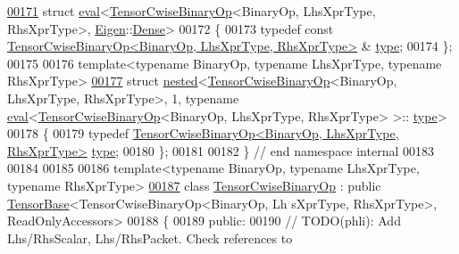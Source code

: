 \begin{DoxyCode}
\hyperlink{struct_eigen_1_1internal_1_1eval_3_01_tensor_cwise_binary_op_3_01_binary_op_00_01_lhs_xpr_type_07911fe375dfab05cfcedb209a79e59fe}{00171} \textcolor{keyword}{struct }\hyperlink{struct_eigen_1_1internal_1_1eval}{eval}<\hyperlink{class_eigen_1_1_tensor_cwise_binary_op}{TensorCwiseBinaryOp}<BinaryOp, LhsXprType, RhsXprType>, 
      \hyperlink{namespace_eigen}{Eigen}::\hyperlink{struct_eigen_1_1_dense}{Dense}>
00172 \{
00173   \textcolor{keyword}{typedef} \textcolor{keyword}{const} \hyperlink{class_eigen_1_1_tensor_cwise_binary_op}{TensorCwiseBinaryOp<BinaryOp, LhsXprType, RhsXprType>}
      & \hyperlink{class_eigen_1_1_tensor_cwise_binary_op}{type};
00174 \};
00175 
00176 \textcolor{keyword}{template}<\textcolor{keyword}{typename} BinaryOp, \textcolor{keyword}{typename} LhsXprType, \textcolor{keyword}{typename} RhsXprType>
\hyperlink{struct_eigen_1_1internal_1_1nested_3_01_tensor_cwise_binary_op_3_01_binary_op_00_01_lhs_xpr_typec43a72cea85b54495a72d72517229ff1}{00177} \textcolor{keyword}{struct }\hyperlink{struct_eigen_1_1internal_1_1nested}{nested}<\hyperlink{class_eigen_1_1_tensor_cwise_binary_op}{TensorCwiseBinaryOp}<BinaryOp, LhsXprType, RhsXprType>, 1, typename 
      \hyperlink{struct_eigen_1_1internal_1_1eval}{eval}<\hyperlink{class_eigen_1_1_tensor_cwise_binary_op}{TensorCwiseBinaryOp}<BinaryOp, LhsXprType, RhsXprType> >::
      \hyperlink{class_eigen_1_1_tensor_cwise_binary_op}{type}>
00178 \{
00179   \textcolor{keyword}{typedef} \hyperlink{class_eigen_1_1_tensor_cwise_binary_op}{TensorCwiseBinaryOp<BinaryOp, LhsXprType, RhsXprType>}
       \hyperlink{class_eigen_1_1_tensor_cwise_binary_op}{type};
00180 \};
00181 
00182 \}  \textcolor{comment}{// end namespace internal}
00183 
00184 
00185 
00186 \textcolor{keyword}{template}<\textcolor{keyword}{typename} BinaryOp, \textcolor{keyword}{typename} LhsXprType, \textcolor{keyword}{typename} RhsXprType>
\hyperlink{class_eigen_1_1_tensor_cwise_binary_op}{00187} \textcolor{keyword}{class }\hyperlink{class_eigen_1_1_tensor_cwise_binary_op}{TensorCwiseBinaryOp} : \textcolor{keyword}{public} \hyperlink{class_eigen_1_1_tensor_base}{TensorBase}<TensorCwiseBinaryOp<BinaryOp, Lh
      sXprType, RhsXprType>, ReadOnlyAccessors>
00188 \{
00189   \textcolor{keyword}{public}:
00190     \textcolor{comment}{// TODO(phli): Add Lhs/RhsScalar, Lhs/RhsPacket.  Check references to}

\end{DoxyCode}
